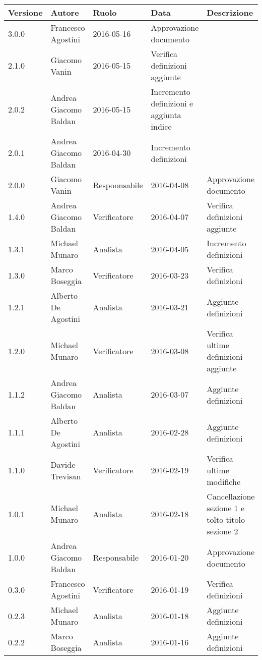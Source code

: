 \documentclass{scalatekids-article}
\begin{document}
\begin{center}
  \begin{longtable}{|l | l | l | l | l |}
    \hline
    Versione & Autore & Ruolo & Data & Descrizione \\
    \hline
    3.0.0 & Francesco Agostini & 2016-05-16 & Approvazione documento\\
    \hline
    2.1.0 & Giacomo Vanin & 2016-05-15 & Verifica definizioni aggiunte\\
    \hline
    2.0.2 & Andrea Giacomo Baldan & 2016-05-15 & Incremento definizioni e aggiunta indice\\
    \hline
    2.0.1 & Andrea Giacomo Baldan & 2016-04-30 & Incremento definizioni\\
    \hline
    2.0.0 & Giacomo Vanin & Respoonsabile & 2016-04-08 & Approvazione documento\\
    \hline
    1.4.0 & Andrea Giacomo Baldan & Verificatore & 2016-04-07 & Verifica definizioni aggiunte\\
    \hline
    1.3.1 & Michael Munaro & Analista & 2016-04-05 & Incremento definizioni\\
    \hline
    1.3.0 & Marco Boseggia & Verificatore & 2016-03-23 & Verifica definizioni\\
    \hline
    1.2.1 & Alberto De Agostini & Analista & 2016-03-21 & Aggiunte definizioni\\
    \hline
    1.2.0 & Michael Munaro & Verificatore & 2016-03-08 & Verifica ultime definizioni aggiunte\\
    \hline
    1.1.2 & Andrea Giacomo Baldan & Analista & 2016-03-07 & Aggiunte definizioni\\
    \hline
    1.1.1 & Alberto De Agostini & Analista & 2016-02-28 & Aggiunte definizioni\\
    \hline
    1.1.0 & Davide Trevisan & Verificatore & 2016-02-19 & Verifica ultime modifiche\\
    \hline
    1.0.1 & Michael Munaro & Analista & 2016-02-18 & Cancellazione sezione 1 e tolto titolo sezione 2\\
    \hline
    1.0.0 & Andrea Giacomo Baldan & Responsabile & 2016-01-20 & Approvazione documento\\
    \hline
    0.3.0 & Francesco Agostini & Verificatore & 2016-01-19 & Verifica definizioni\\
    \hline
    0.2.3 & Michael Munaro & Analista & 2016-01-18 & Aggiunte definizioni\\
    \hline
    0.2.2 & Marco Boseggia & Analista & 2016-01-16 & Aggiunte definizioni\\

\end{longtable}
\end{center}
\end{document}
